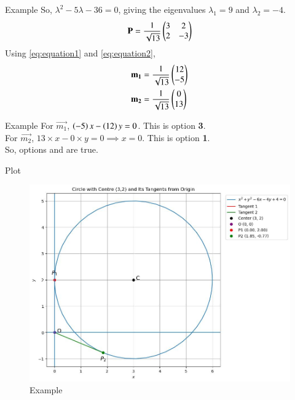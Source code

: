 \documentclass{beamer}
\begin{document}
\begin{frame}{Example}
So, $\lambda^2 - 5\lambda - 36 = 0$, giving the eigenvalues $\lambda_1 = 9$ and $\lambda_2 = -4$.
\begin{align}
    \mathbf{P} = \frac{1}{\sqrt{13}}\begin{pmatrix}3 & 2 \\ 2 & -3\end{pmatrix}
\end{align}
Using \eqref{eq:equation1} and \eqref{eq:equation2},
\begin{align}
    \mathbf{m_1} &= \frac{1}{\sqrt{13}}\begin{pmatrix}12 \\ -5\end{pmatrix} \\
    \mathbf{m_2} &= \frac{1}{\sqrt{13}}\begin{pmatrix}0 \\ 13\end{pmatrix}
\end{align}
\end{frame}

\begin{frame}{Example}
For $\vec{m_1}$, $\left(-5\right)x - \left(12\right)y = 0$. This is option \textbf{3}. \\
For $\vec{m_2}$, $13 \times x - 0 \times y = 0 \implies x = 0$. This is option \textbf{1}. \\
So, options \textbf{} and \textbf{} are true.
\end{frame}

\begin{frame}{Plot}
\begin{figure}
	\centering
	\includegraphics[width=0.7\columnwidth]{../figs/plot_c.jpg}
	\caption{Example}
	\label{fig:example}
\end{figure}
\end{frame}
\end{document}
